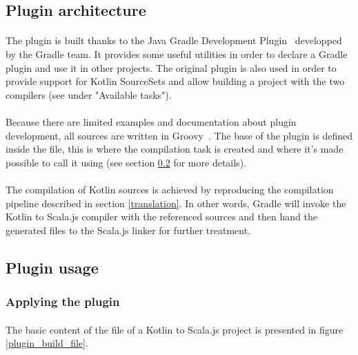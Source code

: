 \subsection{Plugin architecture}

\paragraph{} The plugin is built thanks to the Java Gradle Development Plugin~\cite{gradle_plugins} 
developped by the Gradle team. It provides some useful utilities in order to declare a Gradle 
plugin and use it in other projects. The original  plugin is also used in order 
to provide support for Kotlin SourceSets and allow building a project with the two compilers (see 
under "Available tasks").

\paragraph{} Because there are limited examples and documentation about plugin development, all 
sources are written in Groovy~\cite{groovy}. The base of the plugin is defined inside the 
 file, this is where the compilation task is created and where it's 
made possible to call it using  (see section \ref{plugin_usage} for more 
details).

\paragraph{} The compilation of Kotlin sources is achieved by reproducing the compilation 
pipeline described in section \ref{translation}. In other words, Gradle will invoke the Kotlin to 
Scala.js compiler with the referenced sources and then hand the generated  
files to the Scala.js linker for further treatment.

\subsection{Plugin usage} \label{plugin_usage}

\subsubsection{Applying the plugin}

\paragraph{} The basic content of the  file of a Kotlin to Scala.js project 
is presented in figure \ref{plugin_build_file}.

